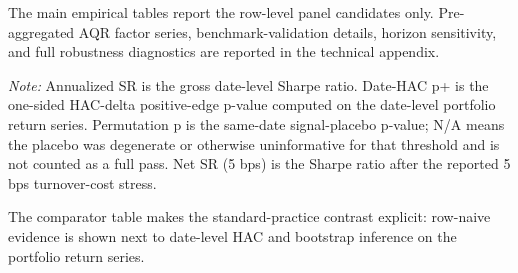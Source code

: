 
The main empirical tables report the row-level panel candidates only.
Pre-aggregated AQR factor series, benchmark-validation details, horizon
sensitivity, and full robustness diagnostics are reported in the
technical appendix.

\begin{table}[!htbp]
\centering
\small
\caption{Panel candidates and date-level evaluation status.}
\label{tab:panel-status}
\par\footnotesize\emph{Note:} Annualized SR is the gross date-level Sharpe ratio. Date-HAC p+ is the one-sided HAC-delta positive-edge p-value computed on the date-level portfolio return series. Permutation p is the same-date signal-placebo p-value; N/A means the placebo was degenerate or otherwise uninformative for that threshold and is not counted as a full pass. Net SR (5 bps) is the Sharpe ratio after the reported 5 bps turnover-cost stress.
\end{table}

The comparator table makes the standard-practice contrast explicit:
row-naive evidence is shown next to date-level HAC and bootstrap
inference on the portfolio return series.

